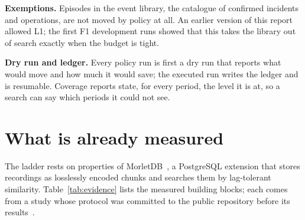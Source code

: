 \documentclass[sigconf,nonacm]{acmart}
\newcommand{\M}{MorletDB}
\begin{document}
\textbf{Exemptions.} Episodes in the event library, the catalogue of confirmed incidents and operations, are not moved by policy at all. An earlier version of this report allowed L1; the first F1 development runs showed that this takes the library out of search exactly when the budget is tight.

\textbf{Dry run and ledger.} Every policy run is first a dry run that reports what would move and how much it would save; the executed run writes the ledger and is resumable. Coverage reports state, for every period, the level it is at, so a search can say which periods it could not see.

\section{What is already measured}\label{sec:evidence}
The ladder rests on properties of \M{}~\cite{morletdb}, a PostgreSQL extension that stores recordings as losslessly encoded chunks and searches them by lag-tolerant similarity. Table~\ref{tab:evidence} lists the measured building blocks; each comes from a study whose protocol was committed to the public repository before its results~\cite{repo}.
\end{document}
